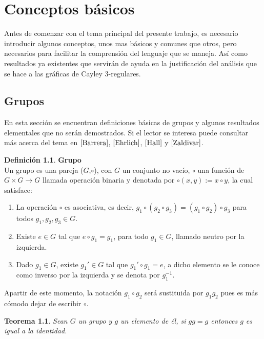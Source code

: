 \documentclass[12pt]{book}
\newtheorem{theorem}{Teorema}
\theoremstyle{definition}
\newtheorem{definition}{Definición}
\begin{document}
\chapter{Conceptos básicos}

Antes de comenzar con el tema principal del presente trabajo, es
necesario introducir algunos conceptos, unos mas básicos y comunes
que otros, pero necesarios para facilitar la comprensión del
lenguaje que se maneja. Así como resultados ya existentes que
servirán de ayuda en la justificación del análisis que se hace a las
gráficas de Cayley 3-regulares.


\section{Grupos}

En esta sección se encuentran definiciones básicas de grupos y
algunos resultados elementales que no serán demostrados. Si
el lector se interesa puede consultar más acerca del tema en
$\cite{Barrera}$, $\cite{Ehrlich}$, $\cite{Hall}$ y $\cite{Zaldivar}$.

\begin{definition}{\textbf{Grupo}}\\ Un grupo es una
pareja ($G$,$\circ$), con $G$ un conjunto no vacío, $\circ$ una
función de $G\times G \rightarrow G$ llamada operación binaria y
denotada por $\circ (x,y):=x\circ y$, la cual satisface:

\begin{enumerate}
\item La operación $\circ$ es asociativa, es decir, $g_1\circ
  (g_2\circ g_3)=(g_1 \circ g_2)\circ g_3$ para todos
  $g_1,g_2,g_3\in G$.
\item Existe $e\in G$ tal que $e\circ g_1=g_1$, para todo
  $g_1\in G$, llamado neutro por la izquierda.
\item Dado $g_1\in G$, existe $g_1'\in G$ tal que $g_1'\circ g_1
  = e$, a dicho elemento se le conoce como inverso por la
  izquierda y se denota por $g_1^{-1}$.
\end{enumerate}
\end{definition}


Apartir de este momento, la notación $g_1\circ g_2$ ser\'a
sustituida por $g_1g_2$ pues es m\'as cómodo dejar de escribir
$\circ$. 



\begin{theorem}\label{gg=g}
  Sean $G$ un grupo y $g$ un elemento de él, si $gg=g$ entonces $g$ es
  igual a la identidad.
\end{theorem}
\end{document}
